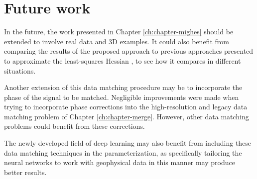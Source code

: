 \section{Future work}
In the future, the work presented in Chapter \ref{ch:chapter-mighes} should be extended to involve real data and 3D examples. 
It could also benefit from comparing the results of the proposed approach to previous approaches presented to approximate the least-squares Hessian \cite[]{migdec,poststack,prestack,diagamp,debfilt,lsamp,pwlsrtm,siklsm}, to see how it compares in different situations.

Another extension of this data matching procedure may be to incorporate
the phase of the signal to be matched. 
Negligible improvements were made when trying to incorporate phase corrections into the high-resolution and legacy data matching problem of Chapter \ref{ch:chapter-merge}. 
However, other data matching problems could benefit from these corrections.

The newly developed field of deep learning may also benefit from including these data matching techniques in the parameterization, as specifically tailoring the neural networks to work with geophysical data in this manner may produce better results.




